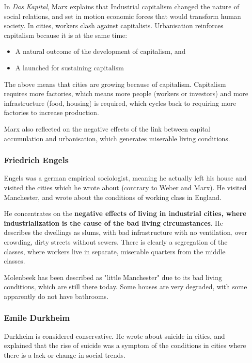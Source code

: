\documentclass{article}
\begin{document}
In \textit{Das Kapital}, Marx explains that Industrial capitalism changed the nature of social relations, and set in motion economic forces that would transform human society. In cities, workers clash against capitalists. Urbanisation reinforces capitalism because it is at the same time:

\begin{itemize}
  \item A natural outcome of the development of capitalism, and
  \item A launched for sustaining capitalism
\end{itemize}

The above means that cities are growing because of capitalism. Capitalism requires more factories, which means more people (workers or investors) and more infrastructure (food, housing) is required, which cycles back to requiring more factories to increase production.

Marx also reflected on the negative effects of the link between capital accumulation and urbanisation, which generates miserable living conditions. 

\subsubsection{Friedrich Engels}

Engels was a german empirical sociologist, meaning he actually left his house and visited the cities which he wrote about (contrary to Weber and Marx). He visited Manchester, and wrote about the conditions of working class in England. 

He concentrates on the \textbf{negative effects of living in industrial cities, where industrialization is the cause of the bad living circumstances}. He describes the dwellings as slums, with bad infrastructure with no ventilation, over crowding, dirty streets without sewers. There is clearly a segregation of the classes, where workers live in separate, miserable quarters from the middle classes. 

Molenbeek has been described as "little Manchester" due to its bad living conditions, which are still there today. Some houses are very degraded, with some apparently do not have bathrooms. 

\subsubsection{Emile Durkheim}

Durkheim is considered conservative. He wrote about suicide in cities, and explained that the rise of suicide was a symptom of the conditions in cities where there is a lack or change in social trends. 
\end{document}
